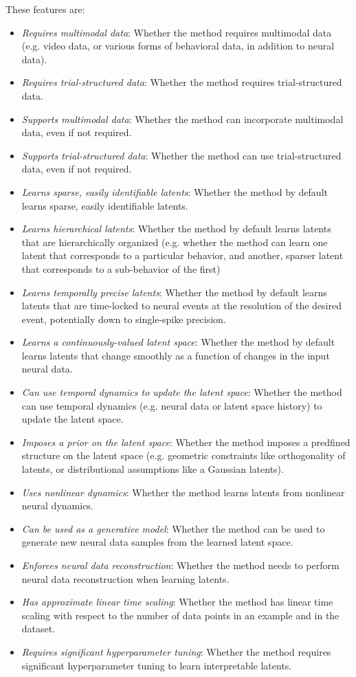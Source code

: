 These features are:
\begin{itemize}
    \item \textit{Requires multimodal data}: Whether the method requires multimodal data (e.g. video data, or various forms of behavioral data, in addition to neural data).
    \item \textit{Requires trial-structured data}: Whether the method requires trial-structured data.
    \item \textit{Supports multimodal data}: Whether the method can incorporate multimodal data, even if not required.
    \item \textit{Supports trial-structured data}: Whether the method can use trial-structured data, even if not required.
    \item \textit{Learns sparse, easily identifiable latents}: Whether the method by default learns sparse, easily identifiable latents.
    \item \textit{Learns hierarchical latents}: Whether the method by default learns latents that are hierarchically organized (e.g. whether the method can learn one latent that corresponds to a particular behavior, and another, sparser latent that corresponds to a sub-behavior of the first)
    \item \textit{Learns temporally precise latents}: Whether the method by default learns latents that are time-locked to neural events at the resolution of the desired event, potentially down to single-spike precision.
    \item \textit{Learns a continuously-valued latent space}: Whether the method by default learns latents that change smoothly as a function of changes in the input neural data.
    \item \textit{Can use temporal dynamics to update the latent space}: Whether the method can use temporal dynamics (e.g. neural data or latent space history) to update the latent space.
    \item \textit{Imposes a prior on the latent space}: Whether the method imposes a predfined structure on the latent space (e.g. geometric constraints like orthogonality of latents, or distributional assumptions like a Gaussian latents).
    \item \textit{Uses nonlinear dynamics}: Whether the method learns latents from  nonlinear neural dynamics.
    \item \textit{Can be used as a generative model}: Whether the method can be used to generate new neural data samples from the learned latent space.
    \item \textit{Enforces neural data reconstruction}: Whether the method needs to perform neural data reconstruction when learning latents.
    \item \textit{Has approximate linear time scaling}: Whether the method has linear time scaling with respect to the number of data points in an example and in the dataset.
    \item \textit{Requires significant hyperparameter tuning}: Whether the method requires significant hyperparameter tuning to learn interpretable latents.
\end{itemize}

